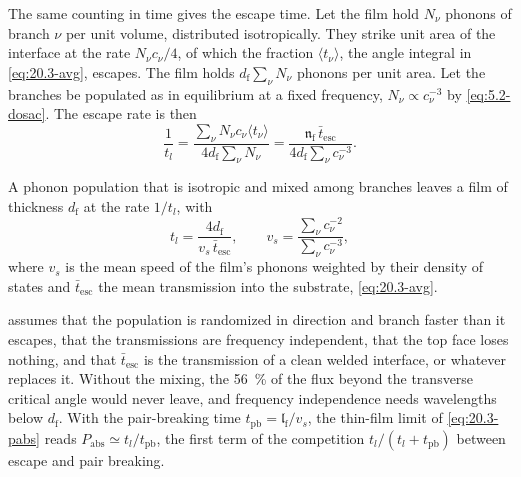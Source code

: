 The same counting in time gives the escape time. Let the film hold $N_\nu$ phonons of branch $\nu$ per unit volume, distributed isotropically. They strike unit area of the interface at the rate $N_\nu c_\nu/4$, of which the fraction $\langle t_\nu\rangle$, the angle integral in \cref{eq:20.3-avg}, escapes. The film holds $d_{\mathrm{f}}\sum_\nu N_\nu$ phonons per unit area. Let the branches be populated as in equilibrium at a fixed frequency, $N_\nu \propto c_\nu^{-3}$ by \cref{eq:5.2-dosac}. The escape rate is then
\begin{equation*}
  \frac{1}{t_l} = \frac{\sum_\nu N_\nu c_\nu\langle t_\nu\rangle}{4d_{\mathrm{f}}\sum_\nu N_\nu} = \frac{\mathfrak{n}_{\mathrm{f}}\,\bar t_{\mathrm{esc}}}{4d_{\mathrm{f}}\sum_\nu c_\nu^{-3}} .
\end{equation*}
\begin{keyresult}
A phonon population that is isotropic and mixed among branches leaves a film of thickness $d_{\mathrm{f}}$ at the rate $1/t_l$, with
\begin{equation}
  t_l = \frac{4d_{\mathrm{f}}}{v_s\,\bar t_{\mathrm{esc}}} , \qquad v_s = \frac{\sum_\nu c_\nu^{-2}}{\sum_\nu c_\nu^{-3}} ,
  \label{eq:20.3-tl}
\end{equation}
where $v_s$ is the mean speed of the film's phonons weighted by their density of states and $\bar t_{\mathrm{esc}}$ the mean transmission into the substrate, \cref{eq:20.3-avg}.
\end{keyresult}
 assumes that the population is randomized in direction and branch faster than it escapes, that the transmissions are frequency independent, that the top face loses nothing, and that $\bar t_{\mathrm{esc}}$ is the transmission of a clean welded interface, or whatever replaces it. Without the mixing, the \SI{56}{\percent} of the flux beyond the transverse critical angle would never leave, and frequency independence needs wavelengths below $d_{\mathrm{f}}$. With the pair-breaking time $t_{\mathrm{pb}} = \mathfrak{l}_{\mathrm{f}}/v_s$, the thin-film limit of \cref{eq:20.3-pabs} reads $P_{\mathrm{abs}} \simeq t_l/t_{\mathrm{pb}}$, the first term of the competition $t_l/(t_l + t_{\mathrm{pb}})$ between escape and pair breaking.

